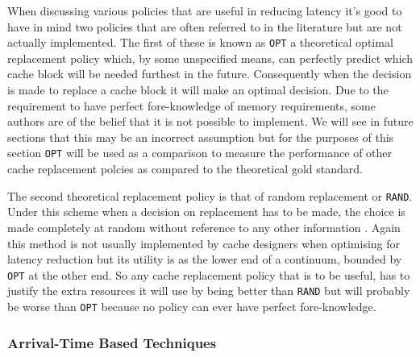 When discussing various policies that are useful in reducing latency it's good to have in mind two policies that are often referred to in the literature but are not actually implemented. The first of these is known as \texttt{OPT} \cite{jeongOptimalReplacementsCaches1999} a theoretical optimal replacement policy which, by some unspecified means, can perfectly predict which cache block will be needed furthest in the future. Consequently when the decision is made to replace a cache block it will make an optimal decision. Due to the requirement to have perfect fore-knowledge of memory requirements, some authors \cite{jeongOptimalReplacementsCaches1999, pandaSurveyReplacementStrategies2016} are of the belief that it is not possible to implement. We will see in future sections that this may be an incorrect assumption but for the purposes of this section \texttt{OPT} will be used as a comparison to measure the performance of other cache replacement polcies as compared to the theoretical gold standard.

The second theoretical replacement policy is that of random replacement or \texttt{RAND}. Under this scheme when a decision on replacement has to be made, the choice is made completely at random without reference to any other information \cite{beladyStudyReplacementAlgorithms1966}. Again this method is not usually implemented by cache designers when optimising for latency reduction \cite{karedlaCachingStrategiesImprove1994} but its utility is as the lower end of a continuum, bounded by \texttt{OPT} at the other end. So any cache replacement policy that is to be useful, has to justify the extra resources it will use by being better than \texttt{RAND} but will probably be worse than \texttt{OPT} because no policy can ever have perfect fore-knowledge.

\subsubsection{Arrival-Time Based Techniques}

